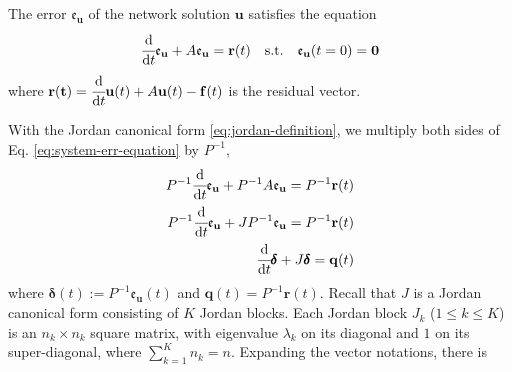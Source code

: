 \documentclass[accepted]{uai2023}
\newcommand{\vect}[1]{\mathbf{#1}}
\newcommand{\dt}[1]{\cfrac{\mathrm{d} #1}{\mathrm{d} t}}
\newcommand{\Err}{\mathfrak{e}}
\begin{document}
    The error $\Err_{\vect{u}}$ of the network solution $\vect{u}$ satisfies the equation
    \begin{equation}\label{eq:system-err-equation}
        \dt{}\Err_{\vect{u}} + A\Err_{\vect{u}} = \vect{r}(t) \quad \text{s.t.} \quad \Err_\vect{u}(t=0) = \vect{0}
    \end{equation}
    where $\vect{r(t)} = \dt{}\vect{u}(t) + A\vect{u}(t) - \vect{f}(t)$ is the residual vector.

    With the Jordan canonical form \ref{eq:jordan-definition}, we multiply both sides of Eq. \ref{eq:system-err-equation} by $P^{-1}$,
    \begin{align}
        P^{-1}\dt{}\Err_{\vect{u}} + P^{-1}A \Err_{\vect{u}} = P^{-1}\vect{r}(t) \\
        P^{-1}\dt{}\Err_{\vect{u}} + JP^{-1} \Err_{\vect{u}} = P^{-1}\vect{r}(t) \\
        \dt{}\pmb{\delta} + J \pmb{\delta}  = \vect{q}(t) 
    \end{align}
    where $\pmb{\delta}(t) := P^{-1}\Err_\vect{u}(t)$ and $\vect{q}(t) = P^{-1}\vect{r}(t)$. Recall that $J$ is a Jordan canonical form consisting of $K$ Jordan blocks. Each Jordan block $J_k$ ($1\leq k \leq K$) is an $n_k \times n_k$ square matrix, with eigenvalue $\lambda_k$ on its diagonal and $1$ on its super-diagonal, where $\sum_{k=1}^{K} n_k = n$. Expanding the vector notations, there is 
    \begingroup
        \newcommand{\?}[1]{\multicolumn{1}{c|}{#1}}
\end{document}
